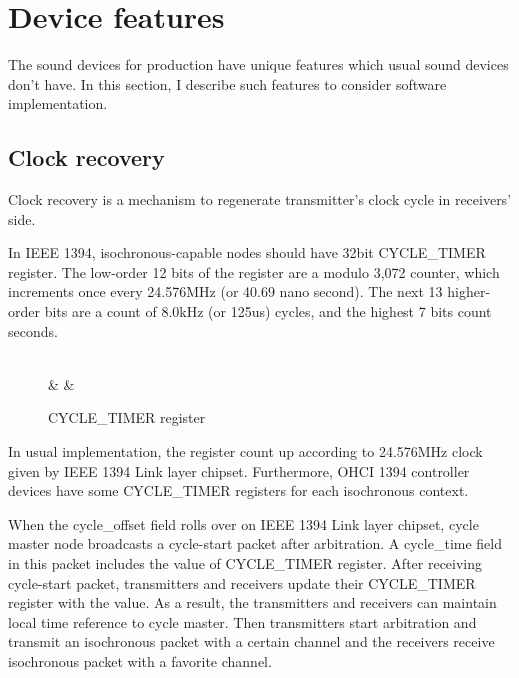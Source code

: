 \documentclass[onecolumn]{article}
\begin{document}
\section{Device features}

The sound devices for production have unique features which usual sound devices don't have. In this section, I describe such features to consider software implementation.

\subsection{Clock recovery}
\label{sec:clock-recovery}

Clock recovery is a mechanism to regenerate transmitter's clock cycle in receivers' side.

In IEEE 1394\cite{ieee1394-2}, isochronous-capable nodes should have 32bit CYCLE\_TIMER register. The low-order 12 bits of the register are a modulo 3,072 counter, which increments once every 24.576MHz (or 40.69 nano second). The next 13 higher-order bits are a count of 8.0kHz (or 125us) cycles, and the highest 7 bits count seconds.

\begin{figure}[htbp]
\centering
\begin{bytefield}[bitwidth=auto,endianness=big]{32}
	 \\
	 &
	 &
\end{bytefield}
\caption{{CYCLE\_TIMER register}}
\label{cycle_timer}
\end{figure}

In usual implementation, the register count up according to 24.576MHz clock given by IEEE 1394 Link layer chipset. Furthermore, OHCI 1394 controller devices have some CYCLE\_TIMER registers for each isochronous context.

When the cycle\_offset field rolls over on IEEE 1394 Link layer chipset, cycle master node broadcasts a cycle-start packet after arbitration. A cycle\_time field in this packet includes the value of CYCLE\_TIMER register. After receiving cycle-start packet, transmitters and receivers update their CYCLE\_TIMER register with the value. As a result, the transmitters and receivers can maintain local time reference to cycle master. Then transmitters start arbitration and transmit an isochronous packet with a certain channel and the receivers receive isochronous packet with a favorite channel.
\end{document}
